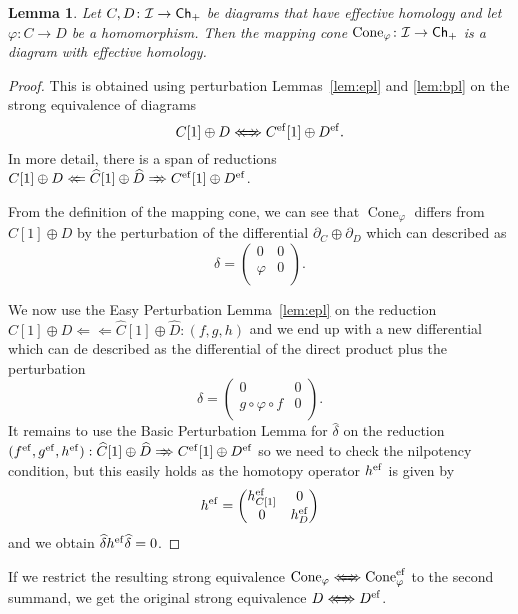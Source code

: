 \documentclass[12pt,a4wide]{article}
\theoremstyle{plain}
\newtheorem{lem}[thm]{Lemma}
\theoremstyle{definition}
\renewcommand\:{\colon}
\def\bo{\partial} %
\def\co{\circ}
\newcommand{\dC}{{C}}
\newcommand{\dD}{D}
\newcommand{\icat}{\mathcal I}
\newcommand\Redu{\Rightarrow\!\!\!\!\Rightarrow}
\newcommand\lredu{\Leftarrow\!\!\!\!\Leftarrow}
\newcommand{\steq}{\Leftarrow\!\!\!\!\Leftarrow\!\!\!\!\Rightarrow\!\!\!\!\Rightarrow}
\DeclareMathOperator\dCone{{Cone}}
\begin{document}
\begin{lem}\label{l:cone}
Let $\dC,\dD \:\icat \to \Ch_+$ be diagrams that have effective homology and let $\varphi \colon \dC \to \dD$ be a homomorphism. Then the mapping cone $\dCone_\varphi \: \icat \to \Ch_+$ is a diagram with effective homology.
\end{lem}
\begin{proof}
This is obtained using perturbation Lemmas~\ref{lem:epl} and \ref{lem:bpl} on the strong equivalence of diagrams 
\[
\dC[1] \oplus \dD \steq \dC^\ef[1] \oplus \dD^\ef.
\]
In more detail, there is a span of reductions
$\dC[1] \oplus \dD \lredu \widehat{\dC}[1] \oplus \widehat{\dD} \Redu \dC^\ef[1] \oplus \dD^\ef$.

From the definition of the mapping cone, we can see that  $\dCone_\varphi$ differs from $\dC[1] \oplus \dD$ by the perturbation of the differential $\bo_{\dC}  \oplus \bo_{\dD}$ which can described as 
 \[
\delta = 
\begin{pmatrix}
0 & 0 \\
 \varphi& 0\\
\end{pmatrix}.
\]

We now use the Easy Perturbation Lemma~\ref{lem:epl} on the reduction $\dC[1] \oplus \dD \lredu \widehat{\dC}[1] \oplus \widehat{\dD} \colon (f,g,h)$ and we end up with a new differential which can de described as the differential of the direct product plus the perturbation
 \[
\widehat{\delta} = 
\begin{pmatrix}
0 & 0 \\
g \co \varphi \co f & 0\\
\end{pmatrix}.
\]
It remains to use the Basic Perturbation Lemma for $\widehat{\delta}$ on the reduction $(f^\ef, g^\ef, h^\ef): \widehat{\dC}[1] \oplus \widehat{\dD} \Redu \dC^\ef[1] \oplus \dD^\ef$ so we need to check the nilpotency condition, but this easily holds as the homotopy operator $h^{\mathop\mathrm{ef}\nolimits}$ is given by
 \[
h^\ef = 
\begin{pmatrix}
h^\ef_{\dC[1]} &0\\
0 & h^\ef_{\dD}\\
\end{pmatrix}
\]
and we obtain $\widehat{\delta} h^{\mathop\mathrm{ef}\nolimits} \widehat{\delta} = 0$.

\end{proof}
If we restrict the resulting strong equivalence ${\dCone_\varphi \steq \dCone^\ef _\varphi}$ to the second summand, we get the original strong equivalence $\dD \steq \dD^\ef$.
\end{document}
